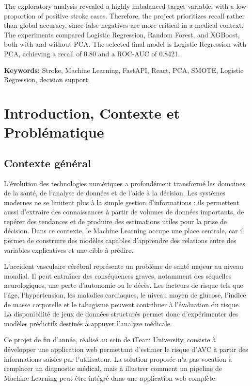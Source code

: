 \documentclass[12pt,a4paper]{report}
\newcommand{\institution}{iTeam University}
\begin{document}
The exploratory analysis revealed a highly imbalanced target variable, with a low proportion of positive stroke cases. Therefore, the project prioritizes recall rather than global accuracy, since false negatives are more critical in a medical context. The experiments compared Logistic Regression, Random Forest, and XGBoost, both with and without PCA. The selected final model is Logistic Regression with PCA, achieving a recall of 0.80 and a ROC-AUC of 0.8421.

\textbf{Keywords:} Stroke, Machine Learning, FastAPI, React, PCA, SMOTE, Logistic Regression, decision support.

\tableofcontents
\listoffigures
\listoftables
\clearpage
{}

\chapter{Introduction, Contexte et Problématique}

\section{Contexte général}
L'évolution des technologies numériques a profondément transformé les domaines de la santé, de l'analyse de données et de l'aide à la décision. Les systèmes modernes ne se limitent plus à la simple gestion d'informations : ils permettent aussi d'extraire des connaissances à partir de volumes de données importants, de repérer des tendances et de produire des estimations utiles pour la prise de décision. Dans ce contexte, le Machine Learning occupe une place centrale, car il permet de construire des modèles capables d'apprendre des relations entre des variables explicatives et une cible à prédire.

L'accident vasculaire cérébral représente un problème de santé majeur au niveau mondial. Il peut entraîner des conséquences graves, notamment des séquelles neurologiques, une perte d'autonomie ou le décès. Les facteurs de risque tels que l'âge, l'hypertension, les maladies cardiaques, le niveau moyen de glucose, l'indice de masse corporelle et le tabagisme peuvent contribuer à l'évaluation du risque. La disponibilité de jeux de données structurés permet donc d'expérimenter des modèles prédictifs destinés à appuyer l'analyse médicale.

Ce projet de fin d'année, réalisé au sein de \institution, consiste à développer une application web permettant d'estimer le risque d'AVC à partir des informations saisies par l'utilisateur. La solution proposée n'a pas vocation à remplacer un diagnostic médical, mais à illustrer comment un pipeline de Machine Learning peut être intégré dans une application web complète.
\end{document}
